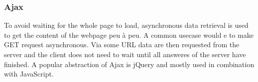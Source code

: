 \subsubsection{Ajax}

To avoid waiting for the whole page to load, asynchronous data retrieval is used to get the content of the webpage peu \`{a} peu. A common usecase would e to make GET request asynchronous. Via some URL data are then requested from the server and the client does not need to wait until all answeres of the server have finished. A popular abstraction of Ajax is jQuery and mostly used in combination with JavaScript.
